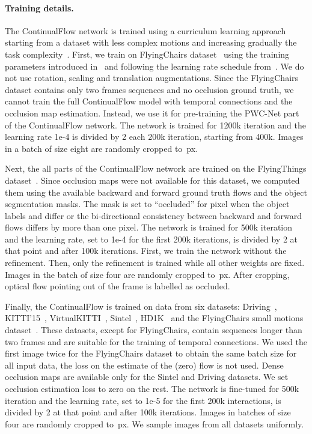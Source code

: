 \documentclass[runningheads]{llncs}
\begin{document}
\paragraph{\bf{Training details.}}
The ContinualFlow network is trained using a curriculum learning approach~\cite{Bengio2009} starting from a dataset with less complex motions and increasing gradually the task complexity~\cite{Ilg2016,Sun2017}.
First, we train on FlyingChairs dataset~\cite{Dosovitskiy2015} using the training parameters introduced in~\cite{Sun2017} and following the learning rate schedule from~\cite{Ilg2016}.
We do not use rotation, scaling and translation augmentations.
Since the FlyingChairs dataset contains only two frames sequences and no occlusion ground truth, we cannot train the full ContinualFlow model with temporal connections and the occlusion map estimation.
Instead, we use it for pre-training the PWC-Net part of the ContinualFlow network. 
The network is trained for 1200k iteration and the learning rate 1e-4 is divided by 2 each 200k iteration, starting from 400k.
Images in a batch of size eight are randomly cropped to \,px.

Next, the all parts of the ContinualFlow network are trained on the FlyingThings dataset~\cite{Mayer2016}.
Since occlusion maps were not available for this dataset, we computed them using the available backward and forward ground truth flows and the object segmentation masks.
The mask  is set to ``occluded'' for  pixel  when the object labels  and  differ or the bi-directional consistency between backward and forward flows differs by more than one pixel.
The network is trained for 500k iteration and the learning rate, set to 1e-4 for the first 200k iterations, is divided by 2 at that point and after 100k iterations.
First, we train the network without the refinement.
Then, only the refinement is trained while all other weights are fixed.
Images in the batch of size four are randomly cropped to \,px.
After cropping, optical flow pointing out of the frame is labelled as occluded.

Finally, the ContinualFlow is trained on data from six datasets: Driving~\cite{Mayer2016}, KITTI'15~\cite{Menze2015}, VirtualKITTI~\cite{Gaidon2016}, Sintel~\cite{Butler2012}, HD1K~\cite{Kondermann2016} and the FlyingChairs small motions dataset~\cite{Ilg2016}. 
These datasets, except for FlyingChairs, contain sequences longer than two frames and are suitable for the training of temporal connections.
We used the first image twice for the FlyingChairs dataset to obtain the same batch size for all input data, the loss on the estimate of the (zero) flow  is not used.
Dense occlusion maps are available only for the Sintel and Driving datasets. We set occlusion estimation loss to zero on the rest.
The network is fine-tuned for 500k iteration and the learning rate, set to 1e-5 for the first 200k interactions, is divided by 2 at that point and after 100k iterations.
Images in batches of size four are randomly cropped to \,px.
We sample images from all datasets uniformly.
\end{document}

